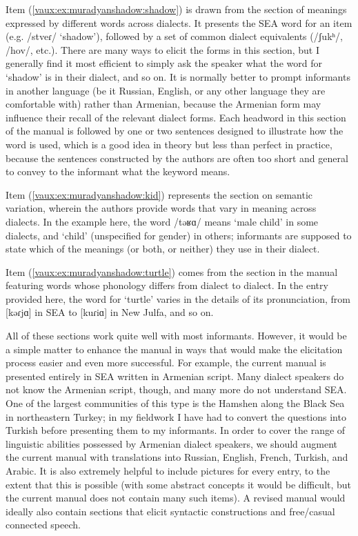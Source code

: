 \documentclass[output=paper]{langscibook}
\begin{document}
Item  (\ref{vaux:ex:muradyanshadow:shadow}) is drawn from the section of meanings expressed by different words across dialects. It presents the SEA word for an item (e.g. /stveɾ/ `shadow'), followed by a set of common dialect equivalents (/ʃukʰ/, /hov/, etc.). There are many ways to elicit the forms in this section, but I generally find it most efficient to simply ask the speaker what the word for `shadow' is in their dialect, and so on. It is normally better to prompt informants in another language (be it Russian, English, or any other language they are comfortable with) rather than Armenian, because the Armenian form may influence their recall of the relevant dialect forms. Each headword in this section of the manual is followed by one or two sentences designed to illustrate how the word is used, which is a good idea in theory but less than perfect in practice, because the sentences constructed by the authors are often too short and general to convey to the informant what the keyword means.

Item (\ref{vaux:ex:muradyanshadow:kid}) represents the section on semantic variation, wherein the authors provide words that vary in meaning across dialects. In the example here, the word /təʁɑ/ means `male child' in some dialects, and `child' (unspecified for gender) in others; informants are supposed to state which of the meanings (or both, or neither) they use in their dialect.

Item (\ref{vaux:ex:muradyanshadow:turtle}) comes from the section in the manual featuring words whose phonology differs from dialect to dialect. In the entry provided here, the word for `turtle' varies in the details of its pronunciation, from [kǝɾjɑ] in SEA to [kuɾiɑ] in New Julfa, and so on.

All of these sections work quite well with most informants. However, it would be a simple matter to enhance the manual in ways that would make the elicitation process easier and even more successful. For example, the current manual is presented entirely in SEA written in Armenian script. Many dialect speakers do not know the Armenian script, though, and many more do not understand SEA. One of the largest communities of this type is the Hamshen along the Black Sea in northeastern Turkey; in my fieldwork I have had to convert the questions into Turkish before presenting them to my informants. In order to cover the range of linguistic abilities possessed by Armenian dialect speakers, we should augment the current manual with translations into Russian, English, French, Turkish, and Arabic. It is also extremely helpful to include pictures for every entry, to the extent that this is possible (with some abstract concepts it would be difficult, but the current manual does not contain many such items). A revised manual would ideally also contain sections that elicit syntactic constructions and free/casual connected speech.
\end{document}
